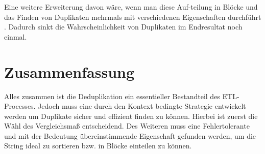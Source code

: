 \documentclass[sigconf]{acmart}
\begin{document}
Eine weitere Erweiterung davon wäre, wenn man diese
Auf-teilung in Blöcke und das Finden von Duplikaten
mehrmals mit verschiedenen Eigenschaften durchführt
\cite[Vlg. S. 11]{elmagarmid1}.
Dadurch sinkt die Wahrscheinlichkeit von Duplikaten
im Endresultat noch einmal.

\section*{Zusammenfassung}
Alles zusammen ist die Deduplikation ein essentieller 
Bestandteil des ETL-Processes.
Jedoch muss eine durch den Kontext bedingte Strategie entwickelt
werden um Duplikate sicher und effizient finden zu
können. Hierbei ist zuerst die Wähl des Vergleichsmaß
entscheidend. Des Weiteren muss eine Fehlertolerante
und mit der Bedeutung übereinstimmende Eigenschaft
gefunden werden, um die String ideal zu sortieren bzw. 
in Blöcke einteilen zu können.



\end{document}
